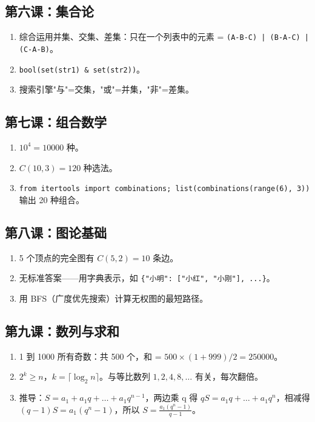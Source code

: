 \documentclass[a4paper,12pt]{ctexart}
\begin{document}
\subsection*{第六课：集合论}
\begin{enumerate}
  \item 综合运用并集、交集、差集：只在一个列表中的元素 = \texttt{(A-B-C) | (B-A-C) | (C-A-B)}。
  \item \texttt{bool(set(str1) \& set(str2))}。
  \item 搜索引擎"与"=交集，"或"=并集，"非"=差集。
\end{enumerate}

\subsection*{第七课：组合数学}
\begin{enumerate}
  \item $10^4 = 10000$ 种。
  \item $C(10, 3) = 120$ 种选法。
  \item \texttt{from itertools import combinations; list(combinations(range(6), 3))} 输出 20 种组合。
\end{enumerate}

\subsection*{第八课：图论基础}
\begin{enumerate}
  \item 5 个顶点的完全图有 $C(5,2) = 10$ 条边。
  \item 无标准答案——用字典表示，如 \texttt{\{"小明": ["小红", "小刚"], ...\}}。
  \item 用 BFS（广度优先搜索）计算无权图的最短路径。
\end{enumerate}

\subsection*{第九课：数列与求和}
\begin{enumerate}
  \item 1 到 1000 所有奇数：共 500 个，和 = $500 \times (1+999)/2 = 250000$。
  \item $2^k \ge n$，$k = \lceil \log_2 n \rceil$。与等比数列 $1, 2, 4, 8, \dots$ 有关，每次翻倍。
  \item 推导：$S = a_1 + a_1q + \dots + a_1q^{n-1}$，两边乘 q 得 $qS = a_1q + \dots + a_1q^n$，相减得 $(q-1)S = a_1(q^n - 1)$，所以 $S = \frac{a_1(q^n - 1)}{q - 1}$。
\end{enumerate}
\end{document}
